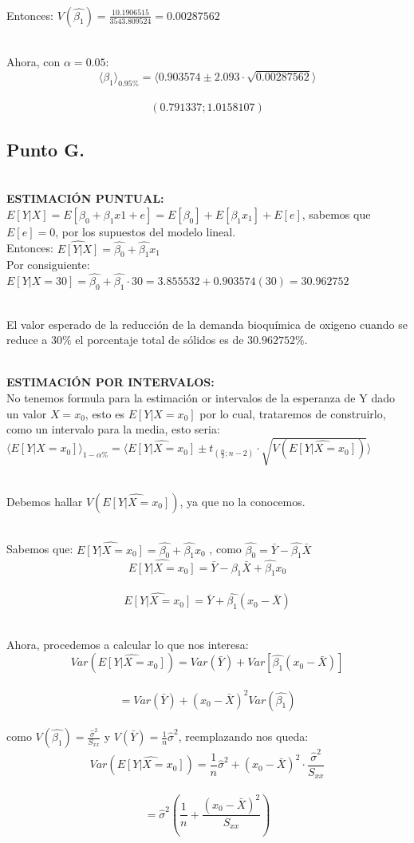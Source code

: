 \documentclass[letterpaper,12pt,onecolumn,titlepage]{article}
\begin{document}
~\\ Entonces: $V(\hat{\beta_{1}})=\frac{10.1906515}{3543.809524}=0.00287562$

~\\ Ahora, con $\alpha=0.05$:
~\\ $$\langle \beta_{1} \rangle_{0.95\%}=\langle 0.903574 \pm 2.093\cdot \sqrt{0.00287562} \rangle$$
~\\ $$(0.791337 ; 1.0158107) $$
\subsection{Punto G.}
~\\ \textbf{ESTIMACI\'{O}N PUNTUAL:}
~\\ $E[Y|X]=E[\beta_{0}+\beta_{1}x1+e]=E[\beta_{0}]+E[\beta_{1}x_{1}]+E[e]$, sabemos que $E[e]=0$, por los supuestos del modelo lineal.
~\\ Entonces: $\hat{E[Y|X]}=\hat{\beta_{0}}+\hat{\beta_{1}}x_{1}$
~\\ Por consiguiente: $E[Y|X=30]=\hat{\beta_{0}}+\hat{\beta_{1}}\cdot 30=3.855532+0.903574(30)=30.962752$

~\\ El valor esperado de la reducci\'{o}n de la demanda bioqu\'{i}mica de oxigeno cuando se reduce a $30\%$ el porcentaje total de s\'{o}lidos es de $30.962752\%$.


~\\ \textbf{ESTIMACI\'{O}N POR INTERVALOS:}
~\\ No tenemos formula para la estimaci\'{o}n or intervalos de la esperanza de Y dado un valor $X=x_{0}$, esto es $E[Y|X=x_{0}]$ por lo cual, trataremos de construirlo, como un intervalo para la media, esto seria:
~\\ $\langle E[Y|X=x_{0}] \rangle_{1-\alpha\%}=\langle \hat{E[Y|X=x_{0}]} \pm t_{(\frac{\alpha}{2};n-2)}\cdot \sqrt{V(\hat{E[Y|X=x_{0}]})}\rangle $

~\\ Debemos hallar $V(\hat{E[Y|X=x_{0}]})$, ya que no la conocemos.

~\\ Sabemos que: $\hat{E[Y|X=x_{0}]}=\hat{\beta_{0}}+\hat{\beta_{1}}x_{0}$  , como $\hat{\beta_{0}}=\bar{Y}-\hat{\beta_{1}}\bar{X}$ 
~\\ $$\hat{E[Y|X=x_{0}]}=\bar{Y}-\beta_{1}\bar{X}+\hat{\beta_{1}}x_{0}$$
~\\ $$\hat{E[Y|X=x_{0}]}=\bar{Y}+\hat{\beta_{1}}(x_{0}-\bar{X})$$

~\\ Ahora, procedemos a calcular lo que nos interesa:
~\\ $$Var(\hat{E[Y|X=x_{0}]})=Var(\bar{Y})+Var[\hat{\beta_{1}}(x_{0}-\bar{X})]$$
~\\ $$=Var(\bar{Y})+(x_{0}-\bar{X})^2 Var(\hat{\beta_{1}})$$ 
~\\ como $V(\hat{\beta_{1}})=\frac{\hat{\sigma}^2}{S_{xx}}$ y $V(\bar{Y})=\frac{1}{n}\hat{\sigma}^2$, reemplazando nos queda:
~\\ $$Var(\hat{E[Y|X=x_{0}]})=\frac{1}{n}\hat{\sigma}^2 + (x_{0}-\bar{X})^2 \cdot \frac{\hat{\sigma}^2}{S_{xx}}$$
~\\ $$=\hat{\sigma}^2 \left( \frac{1}{n}+\frac{(x_{0}-\bar{X})^2}{S_{xx}}\right)$$
\end{document}
